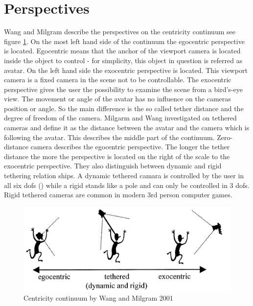 \section{Perspectives}
Wang and Milgram \cite{Wang2001} describe the perspectives on the centricity continuum see figure \ref{fig:ego-exo-cont}. On the most left hand side of the continuum the egocentric perspective is located. Egocentric means that the anchor of the viewport camera is located inside the object to control - for simplicity, this object in question is referred as avatar. On the left hand side the exocentric perspective is located. This viewport camera is a fixed camera in the scene not to be controllable. The exocentric perspective gives the user the possibility to examine the scene from a bird's-eye view. The movement or angle of the avatar has no influence on the cameras position or angle. So the main difference is the so called tether distance and the degree of freedom of the camera. Milgarm and Wang investigated on tethered cameras and define it as the distance between the avatar and the camera which is following the avatar. This describes the middle part of the continuum. Zero-distance camera describes the egocentric perspective. The longer the tether distance the more the perspective is located on the right of the scale to the exocentric perspective. They also distinguish between dynamic and rigid tethering relation ships. A dynamic tethered camara is controlled by the user in all six dofs (\todo) while a rigid stands like a pole and can only be controlled in 3 dofs. Rigid tethered cameras are common in modern 3rd person computer games.
\begin{figure}
	\centering
		\includegraphics[width=1.0\textwidth]{img/ego_exo_continuum_bigger.PNG}
	\caption{Centricity continuum by Wang and Milgram 2001 \cite{Wang2001}}
	\label{fig:ego-exo-cont}
\end{figure}

